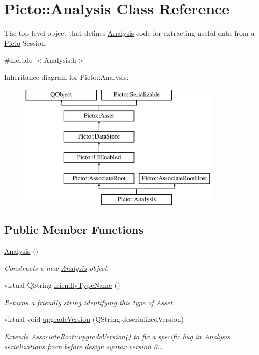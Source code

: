 \hypertarget{class_picto_1_1_analysis}{\section{Picto\-:\-:Analysis Class Reference}
\label{class_picto_1_1_analysis}
}


The top level object that defines \hyperlink{class_picto_1_1_analysis}{Analysis} code for extracting useful data from a \hyperlink{namespace_picto}{Picto} Session.  




{\ttfamily \#include $<$Analysis.\-h$>$}

Inheritance diagram for Picto\-:\-:Analysis\-:\begin{figure}[H]
\begin{center}
\leavevmode
\includegraphics[height=6.000000cm]{class_picto_1_1_analysis}
\end{center}
\end{figure}
\subsection*{Public Member Functions}
\begin{DoxyCompactItemize}
\item 
\hyperlink{class_picto_1_1_analysis_a19ba6527991e247e2493d539f8e6b2ee}{Analysis} ()
\begin{DoxyCompactList}\small\item\em Constructs a new \hyperlink{class_picto_1_1_analysis}{Analysis} object. \end{DoxyCompactList}\item 
virtual Q\-String \hyperlink{class_picto_1_1_analysis_ab0e951f09f33b8172387381d18b189d7}{friendly\-Type\-Name} ()
\begin{DoxyCompactList}\small\item\em Returns a friendly string identifying this type of \hyperlink{class_picto_1_1_asset}{Asset}. \end{DoxyCompactList}\item 
virtual void \hyperlink{class_picto_1_1_analysis_a7ba14912e639d8730c19b3b491d49e8a}{upgrade\-Version} (Q\-String deserialized\-Version)
\begin{DoxyCompactList}\small\item\em Extends \hyperlink{class_picto_1_1_u_i_enabled_a12c0d0357c85854db9220c72c4941b15}{Associate\-Root\-::upgrade\-Version()} to fix a specific bug in \hyperlink{class_picto_1_1_analysis}{Analysis} serializations from before design syntax version 0... \end{DoxyCompactList}\end{DoxyCompactItemize}
